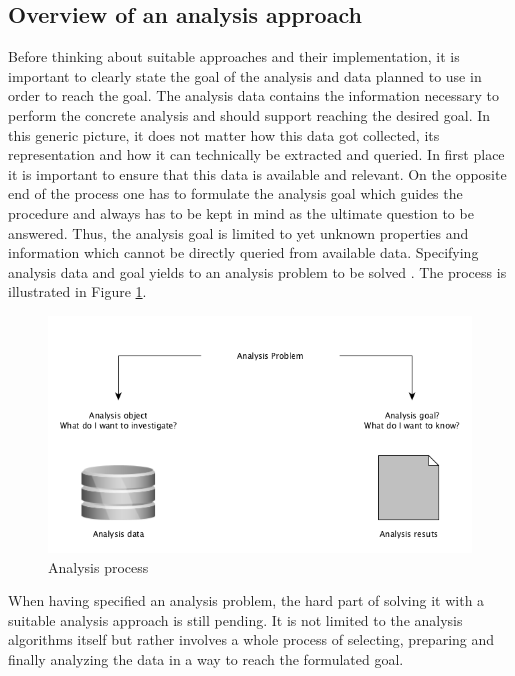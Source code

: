 \subsection{Overview of an analysis approach}
Before thinking about suitable approaches and their implementation, it is important to clearly state the goal of the analysis and data planned to use in order to reach the goal. The analysis data contains the information necessary to perform the concrete analysis and should support reaching the desired goal. In this generic picture, it does not matter how this data got collected, its representation and how it can technically be extracted and queried. In first place it is important to ensure that this data is available and relevant. On the opposite end of the process one has to formulate the analysis goal which guides the procedure and always has to be kept in mind as the ultimate question to be answered. Thus, the analysis goal is limited to yet unknown properties and information which cannot be directly queried from available data. Specifying analysis data and goal yields to an analysis problem to be solved \cite{neckel2015} \cite{knobloch2000data}. The process is illustrated in Figure \ref{fig:analysisProcess}.

\begin{figure}
	\centering
	\includegraphics[width=1.0\textwidth]{img/analysis.png}
	\caption{Analysis process \cite{neckel2015}}
	\label{fig:analysisProcess}
\end{figure} 

When having specified an analysis problem, the hard part of solving it with a suitable analysis approach is still pending. It is not limited to the analysis algorithms itself but rather involves a whole process of selecting, preparing and finally analyzing the data in a way to reach the formulated goal. 


